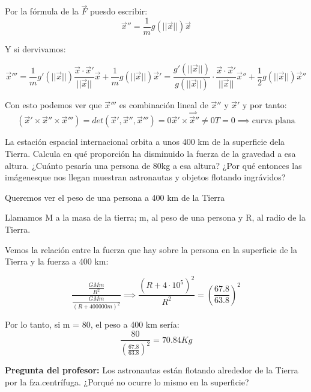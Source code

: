 \begin{problem}[1]
	Por la fórmula de la $\overrightarrow F$ puesdo escribir:
	$$\overrightarrow x'' = \frac{1}{m} g(||\overrightarrow x||)\overrightarrow x $$

	Y si dervivamos:

	$$\overrightarrow x''' = \frac{1}{m} g'(||\overrightarrow x||) \frac{\overrightarrow x \cdot \overrightarrow x'}{||\overrightarrow x||} \overrightarrow x + \frac{1}{m}g(||\overrightarrow x||)\overrightarrow x' = \frac{g'(||\overrightarrow x||)}{g(||\overrightarrow x||)}\cdot \frac{\overrightarrow x \cdot \overrightarrow x'}{||\overrightarrow x||} \overrightarrow x'' + \frac{1}{2}g(||\overrightarrow x||) \overrightarrow x''$$

	Con esto podemos ver que $\overrightarrow x'''$ es combinación lineal de $\overrightarrow x''$ y $\overrightarrow x'$ y por tanto:
	$$(\overrightarrow x' \times \overrightarrow x'' \times \overrightarrow x''') = det(\overrightarrow x', \overrightarrow x'',\overrightarrow x''') = 0 \stackrel{\implies}{\overrightarrow x' \times \overrightarrow x'' \neq 0} T = 0 \implies \text{curva plana}$$
\end{problem}

\begin{problem}[2]

La estación espacial internacional orbita a unos 400 km de la superficie dela Tierra. Calcula en qué proporción ha disminuido la fuerza de la gravedad a esa altura. ¿Cuánto pesaría una persona de 80kg a esa altura? ¿Por qué entonces las imágenesque nos llegan muestran astronautas y objetos flotando ingrávidos?

\solution
	Queremos ver el peso de una persona a 400 km de la Tierra

	Llamamos M a la masa de la tierra; m, al peso de una persona y R, al radio de la Tierra.

	Vemos la relación entre la fuerza que hay sobre la persona en la superficie de la Tierra y la fuerza a 400 km:

	$$\frac{\frac{GMm}{R^2}}{\frac{GMm}{(R + 400000 m)^2}} \implies \frac{(R + 4\cdot 10^5)^2}{R^2} = \left(\frac{67.8}{63.8}\right)^2$$

	Por lo tanto, si m = 80, el peso a 400 km sería:
	$$\frac{80}{\left(\frac{67.8}{63.8}\right)^2} = 70 .84 Kg$$

	\textbf{Pregunta del profesor:} Los astronautas están flotando alrededor de la Tierra por la fza.centrífuga. ¿Porqué no ocurre lo mismo en la superficie?
\end{problem}

